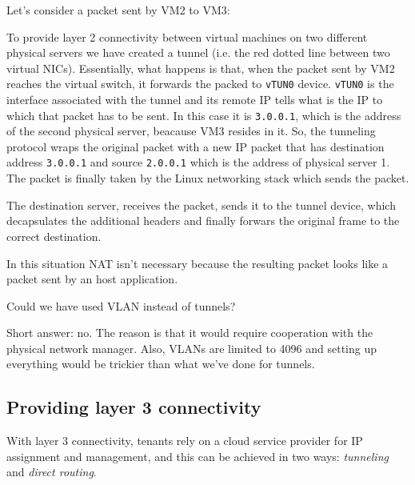 \begin{eg}
    Let's consider a packet sent by VM2 to VM3:

    \begin{figure}[h!]
        \centering
    \end{figure}

    \noindent
    To provide layer 2 connectivity between virtual machines on two different
    physical servers we have created a tunnel (i.e. the red dotted line between
    two virtual NICs). Essentially, what happens is that, when the packet sent
    by VM2 reaches the virtual switch, it forwards the packed to \texttt{vTUN0}
    device. \texttt{vTUN0} is the interface associated with the tunnel and its
    remote IP tells what is the IP to which that packet has to be sent. In this
    case it is \texttt{3.0.0.1}, which is the address of the second physical
    server, beacause VM3 resides in it. So, the tunneling protocol wraps the
    original packet with a new IP packet that has destination address
    \texttt{3.0.0.1} and source \texttt{2.0.0.1} which is the address of physical
    server 1. The packet is finally taken by the Linux networking stack which
    sends the packet.

    The destination server, receives the packet, sends it to the tunnel
    device, which decapsulates the additional headers and finally forwars the
    original frame to the correct destination.
\end{eg}
\begin{note}
    In this situation NAT isn't necessary because the resulting packet looks
    like a packet sent by an host application.
\end{note}

\noindent
Could we have used VLAN instead of tunnels?

Short answer: no. The reason is that it would require cooperation with the
physical network manager. Also, VLANs are limited to 4096 and setting up
everything would be trickier than what we've done for tunnels.

\subsection{Providing layer 3 connectivity}
With layer 3 connectivity, tenants rely on a cloud service provider for IP
assignment and management, and this can be achieved in two ways:
\emph{tunneling} and \emph{direct routing}.

